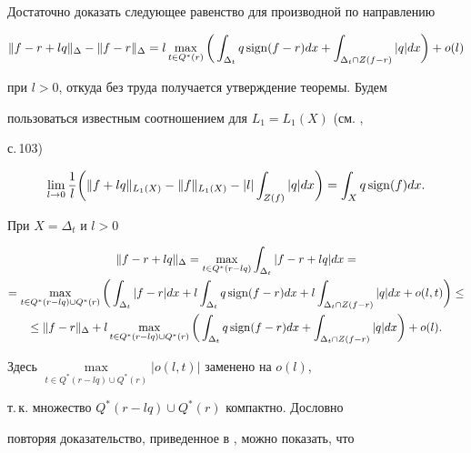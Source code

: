 \begin{pf} 


Достаточно доказать следующее равенство для производной по направлению 


$$ 


\|f-r+l q\|_\Delta-\|f-r\|_\Delta= 


l\max_{t\in Q^*(r)}\bigg(\int_{\Delta_t}q\sign(f-r)dx+ 


\int_{\Delta_t\cap Z(f-r)}|q|dx\bigg)+o(l) 


$$ 


при $l>0$, откуда без труда получается утверждение теоремы. Будем 


пользоваться известным соотношением для $L_1=L_1(X)$ (см. \cite{7}, 


с.\,103) 


$$ 


\lim_{l\to0}\frac{1}{l}\bigg(\|f+l q\|_{L_1(X)}- 


\|f\|_{L_1(X)}-|l|\int_{Z(f)}|q|dx\bigg)= 


\int_X q\sign(f)dx. 


$$ 


При $X=\Delta_t$ и $l>0$ 


\begin{multline*} 


\|f-r+l q\|_\Delta=\max_{t\in Q^*(r-l q)}\int_{\Delta_t} 


|f-r+l q|dx= \\ 


% 


=\max_{t\in Q^*(r-l q)\cup Q^*(r)}\bigg(\int_{\Delta_t} 


|f-r|dx+l\int_{\Delta_t}q\sign(f-r)dx+l 


\int_{\Delta_t\cap Z(f-r)}|q|dx+o(l,t)\bigg)\le \\ 


% 


\le\|f-r\|_\Delta+l\max_{t\in Q^*(r-l q)\cup Q^*(r)}\bigg( 


\int_{\Delta_t}q\sign(f-r)dx+ 


\int_{\Delta_t\cap Z(f-r)}|q|dx\bigg)+o(l). 


\end{multline*} 


Здесь $\max\limits_{t\in Q^*(r-l q)\cup Q^*(r)}|o(l,t)|$ заменено на $o(l)$, 


т.\,к. множество $Q^*(r-lq )\cup Q^*(r)$ компактно. Дословно 


повторяя доказательство, приведенное в \cite{5}, можно показать, что 



\end{pf}
